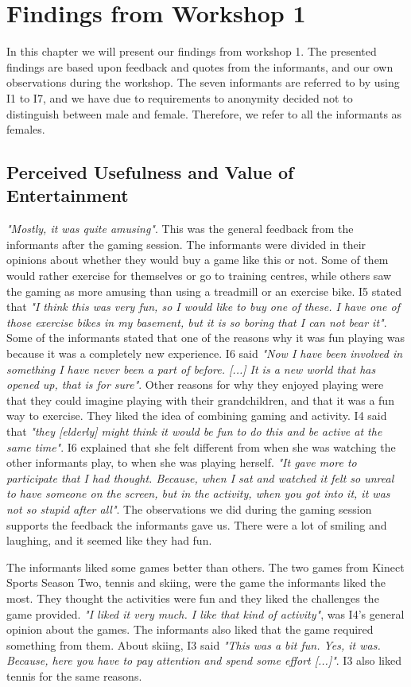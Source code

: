 \chapter{Findings from Workshop 1}
In this chapter we will present our findings from workshop 1. The presented findings are based upon feedback and quotes from the informants, and our own observations during the workshop. The seven informants are referred to by using I1 to I7, and we have due to requirements to anonymity decided not to distinguish between male and female. Therefore, we refer to all the informants as females.  

\section{Perceived Usefulness and Value of Entertainment}
\emph{"Mostly, it was quite amusing"}. This was the general feedback from the informants after the gaming session. The informants were divided in their opinions about whether they would buy a game like this or not. Some of them would rather exercise for themselves or go to training centres, while others saw the gaming as more amusing than using a treadmill or an exercise bike. I5 stated that \emph{"I think this was very fun, so I would like to buy one of these. I have one of those exercise bikes in my basement, but it is so boring that I can not bear it"}.  Some of the informants stated that one of the reasons why it was fun playing was because it was a completely new experience. I6 said \emph{"Now I have been involved in something I have never been a part of before. [...] It is a new world that has opened up, that is for sure"}. Other reasons for why they enjoyed playing were that they could imagine playing with their grandchildren, and that it was a fun way to exercise. They liked the idea of combining gaming and activity. I4 said that \emph{"they [elderly] might think it would be fun to do this and be active at the same time"}. I6 explained that she felt different from when she was watching the other informants play, to when she was playing herself. \emph{"It gave more to participate that I had thought. Because, when I sat and watched it felt so unreal to have someone on the screen, but in the activity, when you got into it, it was not so stupid after all"}. The observations we did during the gaming session supports the feedback the informants gave us. There were a lot of smiling and laughing, and it seemed like they had fun.  

The informants liked some games better than others. The two games from Kinect Sports Season Two, tennis and skiing, were the game the informants liked the most. They thought the activities were fun and they liked the challenges the game provided. \emph{"I liked it very much. I like that kind of activity"}, was I4's general opinion about the games. The informants also liked that the game required something from them. About skiing, I3 said \emph{"This was a bit fun. Yes, it was. Because, here you have to pay attention and spend some effort [...]"}. I3 also liked tennis for the same reasons.  

